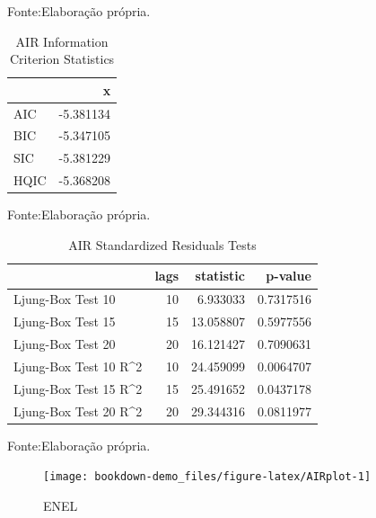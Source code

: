 \documentclass[
  12pt,
  a4paper,
  openany]{book}
\begin{document}
Fonte:Elaboração própria.

\justifying
\bigskip

\begin{table}[!h]

\caption{\label{tab:unnamed-chunk-41}AIR Information Criterion Statistics}
\centering
\begin{tabular}[t]{lr}
\toprule
  & x\\
\midrule
AIC & -5.381134\\
BIC & -5.347105\\
SIC & -5.381229\\
HQIC & -5.368208\\
\bottomrule
\end{tabular}
\end{table}
\FloatBarrier
\centering

Fonte:Elaboração própria.

\justifying
\bigskip

\begin{table}[!h]

\caption{\label{tab:unnamed-chunk-42}AIR Standardized Residuals Tests}
\centering
\begin{tabular}[t]{lrrr}
\toprule
  & lags & statistic & p-value\\
\midrule
Ljung-Box Test 10 & 10 & 6.933033 & 0.7317516\\
Ljung-Box Test 15 & 15 & 13.058807 & 0.5977556\\
Ljung-Box Test 20 & 20 & 16.121427 & 0.7090631\\
Ljung-Box Test 10 R\textasciicircum{}2 & 10 & 24.459099 & 0.0064707\\
Ljung-Box Test 15 R\textasciicircum{}2 & 15 & 25.491652 & 0.0437178\\
\addlinespace
Ljung-Box Test 20 R\textasciicircum{}2 & 20 & 29.344316 & 0.0811977\\
\bottomrule
\end{tabular}
\end{table}
\FloatBarrier
\centering

Fonte:Elaboração própria.

\justifying
\bigskip
\begin{figure}

{\centering \texttt{[image: bookdown-demo\_files/figure-latex/AIRplot-1]} 

}

\caption{ENEL}\label{fig:AIRplot}
\end{figure}
\FloatBarrier
\centering
\end{document}
